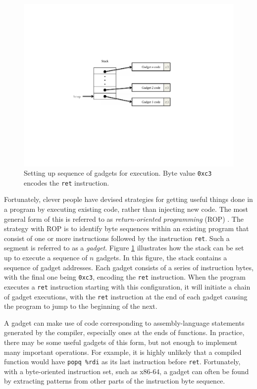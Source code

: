 \documentclass[11pt]{article}
\newcommand{\reg}[1]{\textrm{\texttt{\%#1}}}
\newcommand{\rdireg}{\reg{rdi}}
\begin{document}
\begin{figure}
\centerline{\includegraphics*[scale=0.8]{rop}}
\caption{Setting up sequence of gadgets for execution.  Byte
value \texttt{0xc3} encodes the \texttt{ret} instruction.}
 \label{fig:rop}
\end{figure}

Fortunately, clever people have devised strategies for getting useful
things done in a program by executing existing code, rather than
injecting new code.  The most general form of this is referred to as
{\em return-oriented programming} (ROP)
\cite{roemer-2012,schwartz-2011}.  The strategy with ROP is to
identify byte sequences within an existing program that consist of one
or more instructions followed by the instruction \texttt{ret}.  Such
a segment is referred to as a {\em gadget}.  Figure \ref{fig:rop}
illustrates how the stack can be set up to execute a sequence of $n$
gadgets.  In this figure, the stack contains a sequence of gadget
addresses.  Each gadget consists of a series of instruction
bytes, with the final one being \texttt{0xc3}, encoding the
\texttt{ret} instruction.
When the program executes a {\tt ret} instruction starting with this
configuration, it will initiate a chain of gadget executions,
with the {\tt ret} instruction at the end of each gadget causing the
program to jump to the beginning of the next.

A gadget can make use of code corresponding to assembly-language
statements generated by the compiler, especially ones at the ends of 
functions.  In practice, there may be some useful gadgets of this form,
but not enough to implement many important operations.  For example,
it is highly unlikely that a compiled function would have {\tt popq
  \rdireg} as its last instruction before {\tt ret}.  Fortunately,
with a byte-oriented instruction set, such as x86-64, a gadget can
often be found by extracting patterns from other parts of the
instruction byte sequence.
\end{document}
